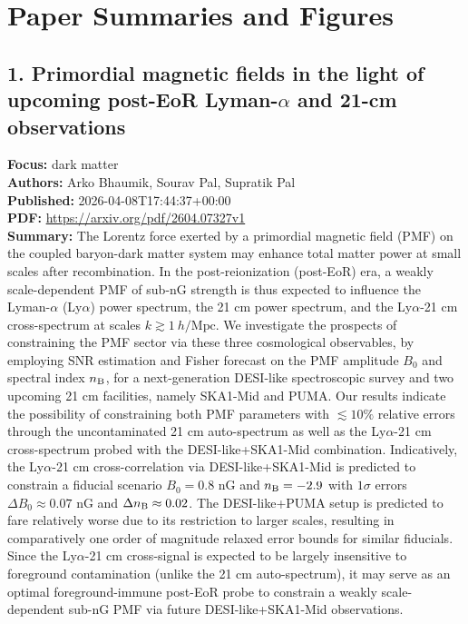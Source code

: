 \documentclass[11pt]{article}
\begin{document}
\section*{Paper Summaries and Figures}
\subsection*{1. Primordial magnetic fields in the light of upcoming post-EoR Lyman-$\alpha $ and 21-cm observations}
\textbf{Focus:} dark matter\\
\textbf{Authors:} Arko Bhaumik, Sourav Pal, Supratik Pal\\
\textbf{Published:} 2026-04-08T17:44:37+00:00\\
\textbf{PDF:} \href{https://arxiv.org/pdf/2604.07327v1}{https://arxiv.org/pdf/2604.07327v1}\\
\textbf{Summary:}
The Lorentz force exerted by a primordial magnetic field (PMF) on the coupled baryon-dark matter system may enhance total matter power at small scales after recombination. In the post-reionization (post-EoR) era, a weakly scale-dependent PMF of sub-nG strength is thus expected to influence the Lyman-$\alpha $ (Ly$\alpha $) power spectrum, the 21 cm power spectrum, and the Ly$\alpha $-21 cm cross-spectrum at scales $k\gtrsim 1\:h/\textrm{Mpc}$. We investigate the prospects of constraining the PMF sector via these three cosmological observables, by employing SNR estimation and Fisher forecast on the PMF amplitude $B_0$ and spectral index $n_{\rm B}$, for a next-generation DESI-like spectroscopic survey and two upcoming 21 cm facilities, namely SKA1-Mid and PUMA. Our results indicate the possibility of constraining both PMF parameters with $\lesssim10\%$ relative errors through the uncontaminated 21 cm auto-spectrum as well as the Ly$\alpha $-21 cm cross-spectrum probed with the DESI-like+SKA1-Mid combination. Indicatively, the Ly$\alpha $-21 cm cross-correlation via DESI-like+SKA1-Mid is predicted to constrain a fiducial scenario $B_0=0.8$ nG and $n_{\rm B}=-2.9$ with $1\sigma $ errors $\Delta B_0\approx 0.07$ nG and $\Delta n_{\rm B}\approx0.02$. The DESI-like+PUMA setup is predicted to fare relatively worse due to its restriction to larger scales, resulting in comparatively one order of magnitude relaxed error bounds for similar fiducials. Since the Ly$\alpha $-21 cm cross-signal is expected to be largely insensitive to foreground contamination (unlike the 21 cm auto-spectrum), it may serve as an optimal foreground-immune post-EoR probe to constrain a weakly scale-dependent sub-nG PMF via future DESI-like+SKA1-Mid observations.
\newpage
\end{document}
